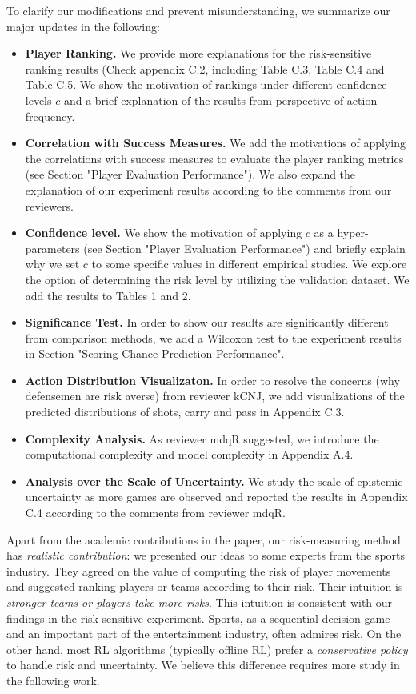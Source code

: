 \documentclass[letterpaper]{article} %
\begin{document}
To clarify our modifications and prevent misunderstanding, we summarize our major updates in the following:
\begin{itemize}
    \item {\bf Player Ranking.} We provide more explanations for the risk-sensitive ranking results (Check appendix C.2, including Table C.3, Table C.4 and Table C.5. We show the motivation of rankings under different confidence levels $c$ and a brief explanation of the results from perspective of action frequency.
    \item {\bf Correlation with Success Measures.} We add the motivations of applying the correlations with success measures to evaluate the player ranking metrics (see Section "Player Evaluation Performance"). We also expand the explanation of our experiment results according to the comments from our reviewers.
    \item {\bf Confidence level.} We show the motivation of applying $c$ as a hyper-parameters (see Section "Player Evaluation Performance") and briefly explain why we set $c$ to some specific values in different empirical studies. We explore the option of determining the risk level by utilizing the validation dataset. We add the results to Tables 1 and 2.
    \item {\bf Significance Test.} In order to show our results are significantly different from comparison methods, we add a Wilcoxon test to the experiment results in Section "Scoring Chance Prediction Performance".
    \item {\bf Action Distribution Visualizaton.} In order to resolve the concerns (why defensemen are risk averse) from reviewer kCNJ, we add visualizations of the predicted distributions of shots, carry and pass in Appendix C.3.
    \item {\bf Complexity Analysis.} As reviewer mdqR suggested, we introduce the computational complexity and model complexity in Appendix A.4.
    \item {\bf Analysis over the Scale of Uncertainty.} We study the scale of epistemic uncertainty as more games are observed and reported the results in Appendix C.4 according to the comments from reviewer mdqR.
\end{itemize}


Apart from the academic contributions in the paper, our risk-measuring method has {\it realistic contribution}: we presented our ideas to some experts from the sports industry. They agreed on the value of computing the risk of player movements and suggested ranking players or teams according to their risk. Their intuition is {\it stronger teams or players take more risks}. This intuition is consistent with our findings in the risk-sensitive experiment. Sports, as a sequential-decision game and an important part of the entertainment industry, often admires risk. On the other hand,  most RL algorithms (typically offline RL) prefer a {\it conservative policy} to handle risk and uncertainty. We believe this difference requires more study in the following work. 
\end{document}
